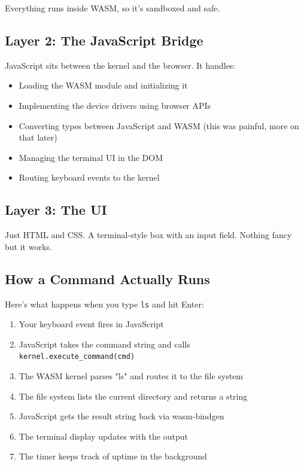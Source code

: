 \documentclass[conference]{IEEEtran}
\begin{document}
Everything runs inside WASM, so it's sandboxed and safe.

\subsection{Layer 2: The JavaScript Bridge}

JavaScript sits between the kernel and the browser. It handles:

\begin{itemize}
    \item Loading the WASM module and initializing it
    \item Implementing the device drivers using browser APIs
    \item Converting types between JavaScript and WASM (this was painful, more on that later)
    \item Managing the terminal UI in the DOM
    \item Routing keyboard events to the kernel
\end{itemize}

\subsection{Layer 3: The UI}

Just HTML and CSS. A terminal-style box with an input field. Nothing fancy but it works.

\subsection{How a Command Actually Runs}

Here's what happens when you type \texttt{ls} and hit Enter:

\begin{enumerate}
    \item Your keyboard event fires in JavaScript
    \item JavaScript takes the command string and calls \texttt{kernel.execute\_command(cmd)}
    \item The WASM kernel parses "ls" and routes it to the file system
    \item The file system lists the current directory and returns a string
    \item JavaScript gets the result string back via wasm-bindgen
    \item The terminal display updates with the output
    \item The timer keeps track of uptime in the background
\end{enumerate}
\end{document}
